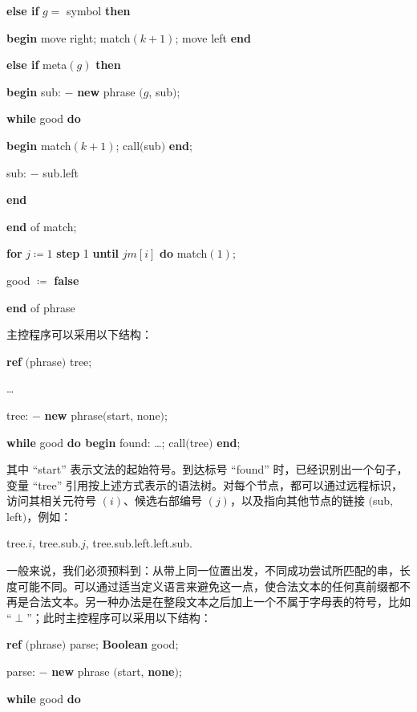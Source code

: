 \quad \quad \quad \textbf{else if} $g =$ symbol \textbf{then}

\quad \quad \quad \textbf{begin} move right; match$(k + 1)$; move left \textbf{end}

\quad \quad \quad \textbf{else if} meta$(g)$ \textbf{then}

\quad \quad \quad \textbf{begin} sub: $-$ \textbf{new} phrase $(g$, sub$)$;

\quad \quad \quad \quad \textbf{while} good \textbf{do}

\quad \quad \quad \quad \textbf{begin} match$(k + 1)$; call$($sub$)$ \textbf{end};

\quad \quad \quad \quad \quad sub: $-$ sub.left

\quad \quad \quad \quad \textbf{end}

\quad \quad \textbf{end} of match;

\quad \quad \textbf{for} $j\coloneq 1$ \textbf{step} 1 \textbf{until} $jm[i]$ \textbf{do} match$(1);$

\quad \quad good $\coloneq$ \textbf{false}

\quad \textbf{end} of phrase

\noindent
主控程序可以采用以下结构：

\quad \textbf{ref} $($phrase$)$ tree;

\quad \dots

\quad tree: $-$ \textbf{new} phrase$($start, none$)$;

\quad \textbf{while} good \textbf{do begin} found: \dots; call$($tree$)$ \textbf{end};

\noindent
其中 ``start'' 表示文法的起始符号。到达标号 ``found'' 时，已经识别出一个句子，变量 ``tree'' 引用按上述方式表示的语法树。对每个节点，都可以通过远程标识，访问其相关元符号 $(i)$、候选右部编号 $(j)$，以及指向其他节点的链接 $($sub, left$)$，例如：

\quad tree.$i$, tree.sub.$j$, tree.sub.left.left.sub.

一般来说，我们必须预料到：从带上同一位置出发，不同成功尝试所匹配的串，长度可能不同。可以通过适当定义语言来避免这一点，使合法文本的任何真前缀都不再是合法文本。另一种办法是在整段文本之后加上一个不属于字母表的符号，比如 ``$\perp$''；此时主控程序可以采用以下结构：

\quad \textbf{ref} $($phrase$)$ parse; \textbf{Boolean} good;

\quad parse: $-$ \textbf{new} phrase $($start, \textbf{none}$)$;

\quad \textbf{while} good \textbf{do}


